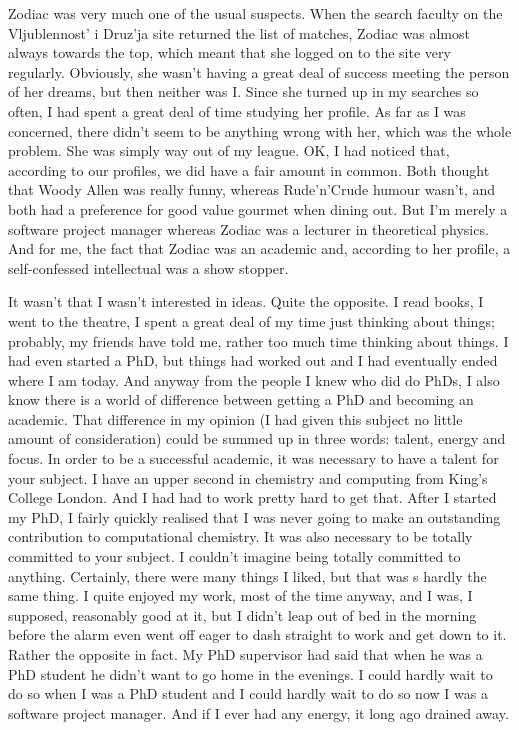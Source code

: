 Zodiac was very much one of the usual suspects. When the search
faculty on the Vljublennost' i Druz'ja site returned the list of
matches, Zodiac was almost always towards the top, which meant that
she logged on to the site very regularly. Obviously, she wasn't
having a great deal of success meeting the person of her dreams, but
then neither was I. Since she turned up in my searches so often, I
had spent a great deal of time studying her profile. As far as I was
concerned, there didn't seem to be anything wrong with her, which
was the whole problem. She was simply way out of my league. OK, I
had noticed that, according to our profiles, we did have a fair
amount in common. Both thought that Woody Allen was really funny,
whereas Rude'n'Crude humour wasn't, and both had a preference for
good value gourmet when dining out. But I'm merely a software
project manager whereas Zodiac was a lecturer in theoretical
physics. And for me, the fact that Zodiac was an academic and,
according to her profile, a self-confessed intellectual was a show
stopper.

It wasn't that I wasn't interested in ideas. Quite the opposite. I
read books, I went to the theatre, I spent a great deal of my time
just thinking about things; probably, my friends have told me,
rather too much time thinking about things. I had even started a
PhD, but things had worked out and I had eventually ended where I am
today. And anyway from the people I knew who did do PhDs, I also
know there is a world of difference between getting a PhD and
becoming an academic. That difference in my opinion (I had given
this subject no little amount of consideration) could be summed up
in three words: talent, energy and focus. In order to be a
successful academic, it was necessary to have a talent for your
subject. I have an upper second in chemistry and computing from
King's College London. And I had had to work pretty hard to get that. After I started my PhD, I fairly quickly realised that I was
never going to make an outstanding contribution to computational
chemistry. It was also necessary to be totally committed to your
subject. I couldn't imagine being totally committed to anything.
Certainly, there were many things I liked, but that was s hardly the
same thing. I quite enjoyed my work, most of the time anyway, and I
was, I supposed, reasonably good at it, but I didn't leap out of bed
in the morning before the alarm even went off eager to dash straight
to work and get down to it. Rather the opposite in fact. My PhD
supervisor had said that when he was a PhD student he didn't want to
go home in the evenings. I could hardly wait to do so when I was a
PhD student and I could hardly wait to do so now I was a software
project manager. And if I ever had any energy, it long ago drained
away.

